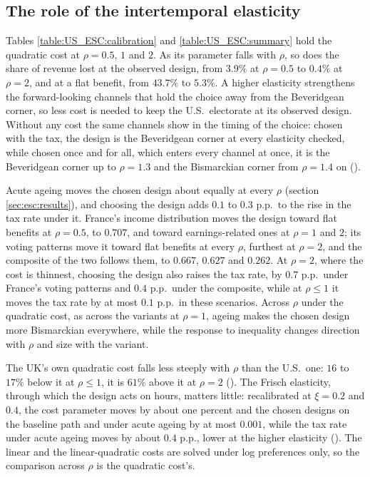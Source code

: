 \subsection{The role of the intertemporal elasticity}\label{app:escDetails:rho}
Tables \ref{table:US_ESC:calibration} and \ref{table:US_ESC:summary} hold the quadratic cost at $\rho = 0.5$, $1$ and $2$. As its parameter falls with $\rho$, so does the share of revenue lost at the observed design, from $3.9\%$ at $\rho = 0.5$ to $0.4\%$ at $\rho = 2$, and at a flat benefit, from $43.7\%$ to $5.3\%$. A higher elasticity strengthens the forward-looking channels that hold the choice away from the Beveridgean corner, so less cost is needed to keep the U.S.\ electorate at its observed design. Without any cost the same channels show in the timing of the choice: chosen with the tax, the design is the Beveridgean corner at every elasticity checked, while chosen once and for all, which enters every channel at once, it is the Beveridgean corner up to $\rho = 1.3$ and the Bismarckian corner from $\rho = 1.4$ on ().



Acute ageing moves the chosen design about equally at every $\rho$ (section \ref{sec:esc:results}), and choosing the design adds $0.1$ to $0.3$ p.p.\ to the rise in the tax rate under it. France's income distribution moves the design toward flat benefits at $\rho = 0.5$, to $0.707$, and toward earnings-related ones at $\rho = 1$ and $2$; its voting patterns move it toward flat benefits at every $\rho$, furthest at $\rho = 2$, and the composite of the two follows them, to $0.667$, $0.627$ and $0.262$. At $\rho = 2$, where the cost is thinnest, choosing the design also raises the tax rate, by $0.7$ p.p.\ under France's voting patterns and $0.4$ p.p.\ under the composite, while at $\rho \leq 1$ it moves the tax rate by at most $0.1$ p.p.\ in these scenarios. Across $\rho$ under the quadratic cost, as across the variants at $\rho = 1$, ageing makes the chosen design more Bismarckian everywhere, while the response to inequality changes direction with $\rho$ and size with the variant.



The UK's own quadratic cost falls less steeply with $\rho$ than the U.S.\ one: $16$ to $17\%$ below it at $\rho \leq 1$, it is $61\%$ above it at $\rho = 2$ (). The Frisch elasticity, through which the design acts on hours, matters little: recalibrated at $\xi = 0.2$ and $0.4$, the cost parameter moves by about one percent and the chosen designs on the baseline path and under acute ageing by at most $0.001$, while the tax rate under acute ageing moves by about $0.4$ p.p., lower at the higher elasticity (). The linear and the linear-quadratic costs are solved under log preferences only, so the comparison across $\rho$ is the quadratic cost's.
